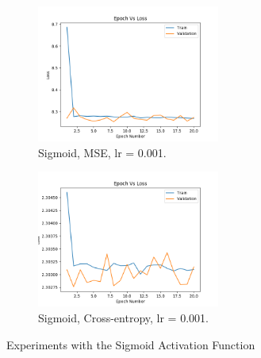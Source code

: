 \documentclass[12pt]{article}
\begin{document}
\begin{figure}
\begin{framed}
				\begin{subfigure}{5.5cm}
					\centering
					\includegraphics[width=6cm]{../Images/Epoch_VS_Loss/Sigmoid_MSE_0001.png}
					\captionsetup{justification=centering,margin=1cm}
					\caption{Sigmoid, MSE, lr = 0.001.}
					\label{fig:sub5}
				\end{subfigure}%
				\begin{subfigure}{5.5cm}
					\centering
					\includegraphics[width=6cm]{../Images/Epoch_VS_Loss/Sigmoid_cross-entropy_0001.png}
					\captionsetup{justification=centering,margin=0.4cm}
					\caption{Sigmoid, Cross-entropy, lr = 0.001.}
					\label{fig:sub6}
				\end{subfigure}	
				\end{framed}
				\captionsetup{justification=centering,margin=1cm}
				\caption{Experiments with the Sigmoid Activation Function}
				\label{Fig_1}
			\end{figure}
\end{document}
